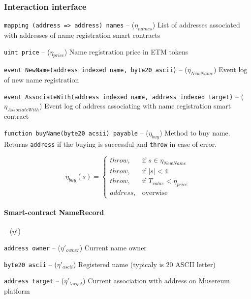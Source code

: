 \documentclass[12pt]{report}
\newcommand{\hlc}[1]{\colorbox{yellow!25}{#1}}
\def\code#1{\colorbox{light-gray}{\texttt{#1}}}
\begin{document}
\subsubsection{Interaction interface}
\label{tech-apps-mns-api}
\code{mapping (address => address) names} – ($\eta_{names}$)\hfill\null\linebreak
List of addresses associated with addresses of name registration smart contracts

\code{uint price} – ($\eta_{price}$)\hfill\null\linebreak
Name registration price in ETM tokens

\code{event NewName(address indexed name, byte20 ascii)} – ($\eta_{NewName}$)\hfill\null\linebreak
\hlc{Event log} of new name registration

\code{event AssociateWith(address indexed name, address indexed target)} – ($\eta_{AssociateWith}$)\hfill\null\linebreak
Event log of address associating with name registration smart contract

\code{function buyName(byte20 acsii) payable} – ($\eta_{buy}$)\hfill\null\linebreak
Method to buy name. Returns \code{address} if the buying is successful and \code{throw} in case of error.

\begin{equation}
\eta_{buy}(s) = \begin{cases}
	throw, & \text{if } s \in \eta_{NewName} \\ 
	throw, & \text{if } |s| < 4 \\
	throw, & \text{if } T_{value} < \eta_{price} \\
	address, & \text{overwise}
\end{cases}
\end{equation}

\paragraph{Smart-contract NameRecord}– ($\eta'$)

\code{address owner} – ($\eta'_{owner}$)\hfill\null\linebreak
Current name owner

\code{byte20 ascii} – ($\eta'_{ascii}$)\hfill\null\linebreak
Registered name (typicaly is 20 ASCII letter)

\code{address target} – ($\eta'_{target}$)\hfill\null\linebreak
Current association with address on Musereum platform
\end{document}
